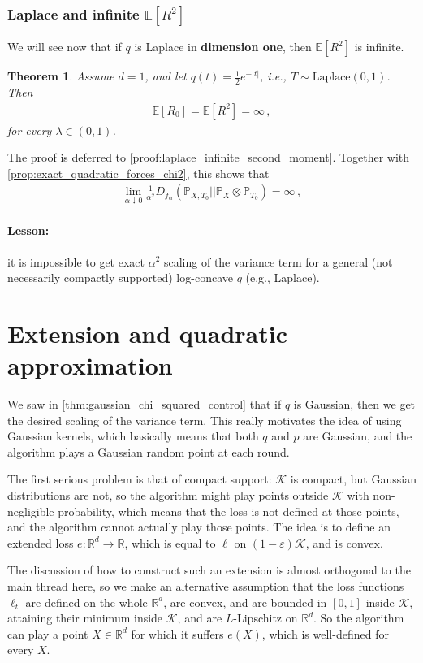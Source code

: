 \documentclass{article}
\theoremstyle{plain}
\newtheorem{theorem}{Theorem}
\theoremstyle{definition}
\theoremstyle{plain}
\newcommand{\R}{\mathbb R}
\newcommand{\Rd}{\mathbb{R}^d}
\newcommand{\E}{\mathbb E}
\newcommand{\K}{\mathcal K}
\newcommand{\PP}{\mathbb P}
\begin{document}
\subsubsection{Laplace and infinite $\E[R^2]$}
We will see now that if $q$ is Laplace in \textbf{dimension one}, then $\E[R^2]$ is infinite.
\begin{theorem}
    \label{prop:laplace_infinite_second_moment}
    Assume $d=1$, and let $q(t)=\frac12 e^{-|t|}$,
    i.e., $T\sim \mathrm{Laplace}(0,1)$.
    Then
    \begin{align}
        \E[R_0] = \E[R^2]=\infty\,,
    \end{align}
    for every $\lambda \in (0,1)$.
\end{theorem}
The proof is deferred to \cref{proof:laplace_infinite_second_moment}.
Together with \cref{prop:exact_quadratic_forces_chi2}, this shows that
\begin{align}
    \lim_{\alpha\downarrow0}
    \frac{1}{\alpha^2}
    D_{f_\alpha}(\PP_{X, T_0} || \PP_X \otimes \PP_{T_0})
    =
    \infty\,,
\end{align}
\paragraph{Lesson:}
it is impossible to get exact $\alpha^2$ scaling of the variance term for a general (not necessarily compactly supported) log-concave $q$ (e.g., Laplace).

\newpage
\section{Extension and quadratic approximation}
We saw in \cref{thm:gaussian_chi_squared_control} that if $q$ is Gaussian, then we get the desired scaling of the variance term.
This really motivates the idea of using Gaussian kernels, which basically means that both $q$ and $p$ are Gaussian, and the algorithm plays a Gaussian random point at each round.

The first serious problem is that of compact support: $\K$ is compact, but Gaussian distributions are not, so the algorithm might play points outside $\K$ with non-negligible probability, which means that the loss is not defined at those points, and the algorithm cannot actually play those points.
The idea is to define an extended loss $e:\Rd \to \R$, which is equal to $\ell$ on $(1-\varepsilon)\K$, and is convex.

The discussion of how to construct such an extension is almost orthogonal to the main thread here,
so we make an alternative assumption that the loss functions $\ell_t$ are defined on the whole $\Rd$, are convex, and are bounded in $[0,1]$ inside $\K$, attaining their minimum inside $\K$, and are $L$-Lipschitz on $\Rd$.
So the algorithm can play a point $X \in \Rd$ for which it suffers $e(X)$, which is well-defined for every $X$.
\end{document}
